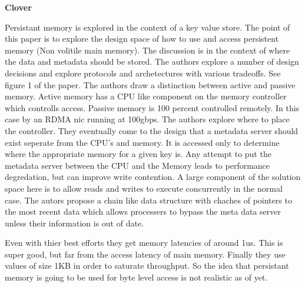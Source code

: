 

\textbf{Clover~\cite{254441}}

Persistant memory is explored in the context of a key value store. The point
of this paper is to explore the design space of how to use and access
persistent memory (Non volitile main memory). The discussion is in the
context of where the data and metadata should be stored. The authors explore
a number of design decisions and explore protocols and archetectures with
various tradeoffs. See figure 1 of the paper. The authors draw a distinction
between active and passive memory. Active memory has a CPU like component on
the memory controller which controlls access. Passive memory is 100 percent
controlled remotely. In this case by an RDMA nic running at 100gbps. The
authors explore where to place the controller. They eventually come to the
design that a metadata server should exist seperate from the CPU's and
memory. It is accessed only to determine where the appropriate memory for a
given key is. Any attempt to put the metadata server between the CPU and the
Memory leads to performance degredation, but can improve write contention. A
large component of the solution space here is to allow reads and writes to
execute concurrently in the normal case. The autors propose a chain like data
structure with chaches of pointers to the most recent data which allows
processers to bypass the meta data server unless their information is out of
date. 

Even with thier best efforts they get memory latencies of around 1us. This is
super good, but far from the access latency of main memory. Finally they use
values of size 1KB in order to saturate throughput. So the idea that
persistant memory is going to be used for byte level access is not realistic
as of yet.


